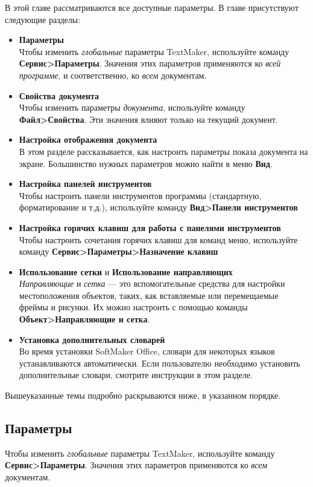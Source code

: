 ﻿\documentclass[a4paper,10pt]{article}
\begin{document}
 В этой главе рассматриваются все доступные параметры. В главе присутствуют следующие разделы:
 
 \begin{itemize}
  \item \textbf{Параметры}\\
  Чтобы изменить \textit{глобальные} параметры TextMaker, используйте команду \textbf{Сервис>Параметры}. Значения этих параметров применяются ко \textit{всей программе}, и соответственно, ко \textit{всем} документам.
  \item \textbf{Свойства документа}\\
  Чтобы изменить параметры \textit{документа}, используйте команду \textbf{Файл>Свойства}. Эти значения влияют только на текущий документ.
  \item \textbf{Настройка отображения документа}\\
  В этом разделе рассказывается, как настроить параметры показа документа на экране. Большинство  нужных параметров можно найти в меню \textbf{Вид}.
  \item \textbf{Настройка панелей инструментов}\\
  Чтобы настроить панели инструментов программы (стандартную, форматирование и т.д.), используйте команду \textbf{Вид>Панели инструментов}
  \item \textbf{Настройка горячих клавиш для работы с панелями инструментов}\\
  Чтобы настроить сочетания горячих клавиш для команд меню, используйте команду \textbf{Сервис>Параметры>Назначение клавиш}
\item \textbf{Использование сетки} и \textbf{Использование направляющих}\\
\textit{Направляющие} и \textit{сетка} — это вспомогательные средства для настройки местоположения объектов, таких, как вставляемые или перемещаемые фреймы и рисунки. Их можно настроить с помощью команды \textbf{Объект>Направляющие и сетка}.
\item \textbf{Установка дополнительных словарей}\\
Во время установки SoftMaker Office, словари для некоторых языков устанавливаются автоматически. Если пользователю необходимо установить дополнительные словари, смотрите инструкции в этом разделе.
 \end{itemize}

 Вышеуказанные темы подробно раскрываются ниже, в указанном порядке.
 
 \subsection{Параметры}
 Чтобы изменить \textit{глобальные} параметры TextMaker, используйте команду \textbf{Сервис>Параметры}. Значения этих параметров применяются ко \textit{всем} документам.
 
\end{document}
